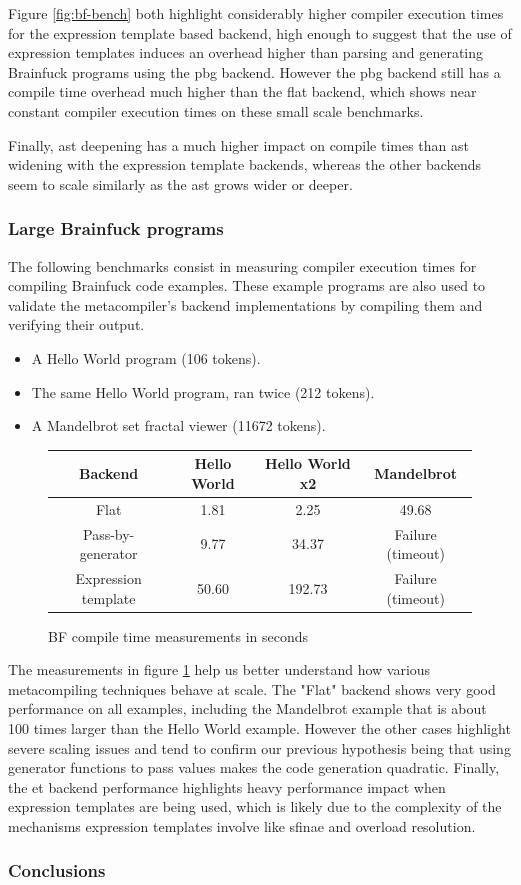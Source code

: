 \documentclass[../main]{subfiles}
\begin{document}
Figure \ref{fig:bf-bench}
both highlight considerably higher compiler execution times for the expression
template based backend, high enough to suggest that the use of expression
templates induces an overhead higher than parsing and generating Brainfuck
programs using the \gls{pbg} backend. However the \gls{pbg}
backend still has a compile time overhead much higher than the flat backend,
which shows near constant compiler execution times on these small scale
benchmarks.

Finally, \gls{ast} deepening has a much higher impact on compile times than \gls{ast}
widening with the expression template backends, whereas the other backends seem
to scale similarly as the \gls{ast} grows wider or deeper.

\subsubsection{
  Large Brainfuck programs
}

The following benchmarks consist in measuring compiler execution times for
compiling Brainfuck code examples. These example programs are also used to
validate the metacompiler's backend implementations by compiling them and
verifying their output.

\begin{itemize}
\item A Hello World program (106 tokens).
\item The same Hello World program, ran twice (212 tokens).
\item A Mandelbrot set fractal viewer (11672 tokens).
\end{itemize}

\begin{figure}
\begin{tabular}{|c|c|c|c|}
\hline
Backend             & Hello World & Hello World x2  & Mandelbrot \\
\hline
Flat                & 1.81        & 2.25            & 49.68 \\
Pass-by-generator   & 9.77        & 34.37           & Failure (timeout) \\
Expression template & 50.60       & 192.73          & Failure (timeout) \\
\hline
\end{tabular}
\caption{BF compile time measurements in seconds
}\label{fig:BF-compile-times}
\end{figure}

The measurements in figure \ref{fig:BF-compile-times} help us better understand
how various metacompiling techniques behave at scale. The "Flat" backend shows
very good performance on all examples, including the Mandelbrot example that is
about 100 times larger than the Hello World example. However the other cases
highlight severe scaling issues and tend to confirm our previous hypothesis
being that using generator functions to pass values makes the code generation
quadratic. Finally, the \gls{et} backend performance highlights
heavy performance impact when expression templates are being used, which is
likely due to the complexity of the mechanisms expression templates involve like
\gls{sfinae} and overload resolution.

\subsubsection{
  Conclusions
}
\end{document}
